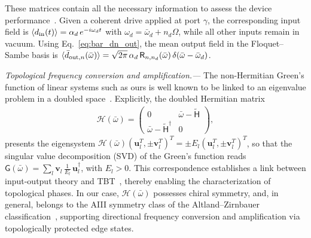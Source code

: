 \documentclass[prl,twocolumn,floatfix,10pt,superscriptaddress]{revtex4-2}
\newcommand{\msf}[1]{\mathsf{#1}}
\newcommand{\mcl}[1]{\mathcal{#1}}
\newcommand{\bsb}[1]{\boldsymbol{#1}}
\newcommand{\bomega}{{\bar{\omega}}}
\newcommand{\mcH}{{\mcl{H}}}
\newcommand{\msH}{{\msf{H}}}
\newcommand{\bu}{{\bsb{u}}}
\newcommand{\bv}{{\bsb{v}}}
\begin{document}
These matrices contain all the necessary information to  assess the device performance~\cite{SM}. Given a coherent drive applied at port $\gamma$, the corresponding input field is $\langle d_{\rm in}(t) \rangle = \alpha_d\, e^{-i\omega_d t}$ with $\omega_d = \bar{\omega}_d + n_d \Omega$, while all other inputs remain in vacuum. Using Eq.~\eqref{eq:bar_dn_out}, the mean output field in the Floquet--Sambe basis is $\langle \bar{d}_{{\rm out}, n}(\bar{\omega}) \rangle = \sqrt{2\pi}\, \alpha_d\, \mathsf{R}_{n,n_d}(\bar{\omega})\, \delta(\bar{\omega}-\bar{\omega}_d)$. 

{\it Topological frequency conversion and amplification.---}
The non-Hermitian Green's function of linear systems such as ours is well known to be linked to an eigenvalue problem in a doubled space~\cite{Porras2019,Ramos2021,ClaveroRubio2025,Gomez2022,GomezLeon2023,Herviou2019}. Explicitly,  the doubled Hermitian matrix
\begin{align}\label{eq:doubled_matrix}
\mcH(\bomega) =
\begin{pmatrix}
0 & \bomega - \tilde{\msH} \\
\bomega - \tilde{\msH}^\dag & 0
\end{pmatrix},
\end{align} presents the eigensystem $\mcH(\bomega)
(\bu_l^T, \pm \bv_l^T
)^T= \pm E_l (\bu_l^T, \pm \bv_l^T)^T$, 
so that the singular value decomposition (SVD) of the Green’s function reads
$\msf{G}(\bomega) = \sum_l \bv_l\, \frac{1}{E_l}\, \bu_l^\dag$, with $E_l>0$. This correspondence establishes a link between input-output theory and TBT~\cite{Ramos2021}, thereby enabling the characterization of topological phases. In our case, $\mcH(\bar{\omega})$ possesses chiral symmetry, and, in general, belongs to the AIII symmetry class of the Altland–Zirnbauer classification~\cite{Altland1997,Roy2017_FTI-classification}, supporting directional frequency conversion and amplification via topologically protected edge states.
\end{document}
